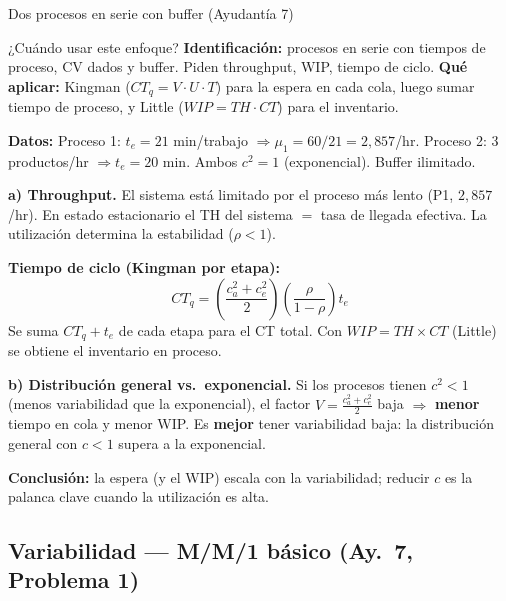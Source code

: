 \begin{ejercicio}{Dos procesos en serie con buffer (Ayudantía 7)}

\begin{tipprueba}{¿Cuándo usar este enfoque?}
\textbf{Identificación:} procesos en serie con tiempos de proceso, CV dados y buffer. Piden throughput, WIP, tiempo de ciclo. \textbf{Qué aplicar:} Kingman ($CT_q = V\cdot U\cdot T$) para la espera en cada cola, luego sumar tiempo de proceso, y Little ($WIP = TH\cdot CT$) para el inventario.
\end{tipprueba}

\textbf{Datos:} Proceso 1: $t_e = 21$ min/trabajo $\Rightarrow \mu_1 = 60/21 = 2{,}857$/hr. Proceso 2: 3 productos/hr $\Rightarrow t_e = 20$ min. Ambos $c^2 = 1$ (exponencial). Buffer ilimitado.

\textbf{a) Throughput.} El sistema está limitado por el proceso más lento (P1, $2{,}857$/hr). En estado estacionario el TH del sistema $= $ tasa de llegada efectiva. La utilización determina la estabilidad ($\rho<1$).

\textbf{Tiempo de ciclo (Kingman por etapa):}
\[
  CT_q = \left(\frac{c_a^2 + c_e^2}{2}\right)\left(\frac{\rho}{1-\rho}\right) t_e
\]
Se suma $CT_q + t_e$ de cada etapa para el CT total. Con $WIP = TH \times CT$ (Little) se obtiene el inventario en proceso.

\textbf{b) Distribución general vs.\ exponencial.} Si los procesos tienen $c^2 < 1$ (menos variabilidad que la exponencial), el factor $V = \frac{c_a^2+c_e^2}{2}$ baja $\Rightarrow$ \textbf{menor} tiempo en cola y menor WIP. Es \textbf{mejor} tener variabilidad baja: la distribución general con $c<1$ supera a la exponencial.

\textbf{Conclusión:} la espera (y el WIP) escala con la variabilidad; reducir $c$ es la palanca clave cuando la utilización es alta.
\end{ejercicio}


\subsection[Variabilidad: M/M/1 Básico]{Variabilidad --- M/M/1 básico (Ay.\ 7, Problema 1)}


